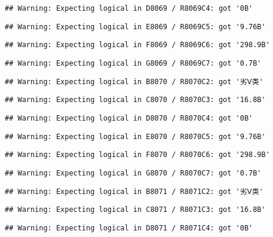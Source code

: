 \documentclass[
]{article}
\begin{document}
\begin{verbatim}
## Warning: Expecting logical in D8069 / R8069C4: got '0B'
\end{verbatim}

\begin{verbatim}
## Warning: Expecting logical in E8069 / R8069C5: got '9.76B'
\end{verbatim}

\begin{verbatim}
## Warning: Expecting logical in F8069 / R8069C6: got '298.9B'
\end{verbatim}

\begin{verbatim}
## Warning: Expecting logical in G8069 / R8069C7: got '0.7B'
\end{verbatim}

\begin{verbatim}
## Warning: Expecting logical in B8070 / R8070C2: got '劣Ⅴ类'
\end{verbatim}

\begin{verbatim}
## Warning: Expecting logical in C8070 / R8070C3: got '16.8B'
\end{verbatim}

\begin{verbatim}
## Warning: Expecting logical in D8070 / R8070C4: got '0B'
\end{verbatim}

\begin{verbatim}
## Warning: Expecting logical in E8070 / R8070C5: got '9.76B'
\end{verbatim}

\begin{verbatim}
## Warning: Expecting logical in F8070 / R8070C6: got '298.9B'
\end{verbatim}

\begin{verbatim}
## Warning: Expecting logical in G8070 / R8070C7: got '0.7B'
\end{verbatim}

\begin{verbatim}
## Warning: Expecting logical in B8071 / R8071C2: got '劣Ⅴ类'
\end{verbatim}

\begin{verbatim}
## Warning: Expecting logical in C8071 / R8071C3: got '16.8B'
\end{verbatim}

\begin{verbatim}
## Warning: Expecting logical in D8071 / R8071C4: got '0B'
\end{verbatim}
\end{document}

